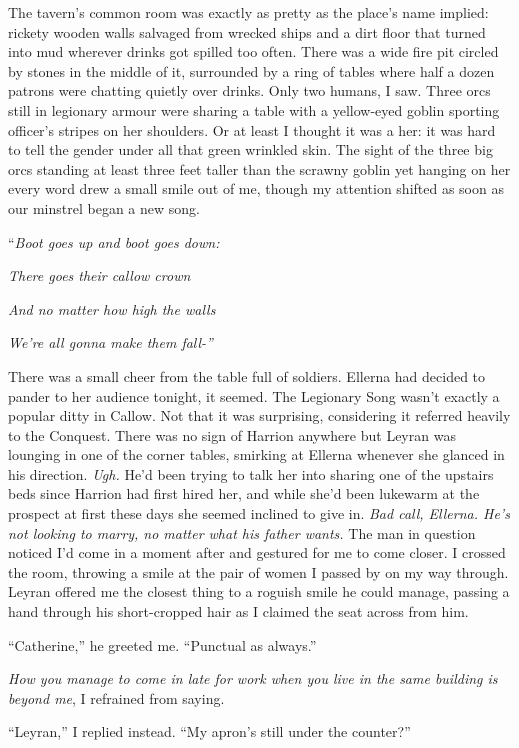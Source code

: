 \documentclass[12pt, openany]{book}
\begin{document}
The tavern’s common room was exactly as pretty as the place’s name implied: rickety wooden walls salvaged from wrecked ships and a dirt floor that turned into mud wherever drinks got spilled too often. There was a wide fire pit circled by stones in the middle of it, surrounded by a ring of tables where half a dozen patrons were chatting quietly over drinks. Only two humans, I saw. Three orcs still in legionary armour were sharing a table with a yellow-eyed goblin sporting officer’s stripes on her shoulders. Or at least I thought it was a her: it was hard to tell the gender under all that green wrinkled skin. The sight of the three big orcs standing at least three feet taller than the scrawny goblin yet hanging on her every word drew a small smile out of me, though my attention shifted as soon as our minstrel began a new song.

“\textit{Boot goes up and boot goes down:}

\textit{There goes their callow crown} 

\textit{And no matter how high the walls } 

\textit{We’re all gonna make them fall-”}

There was a small cheer from the table full of soldiers. Ellerna had decided to pander to her audience tonight, it seemed. The Legionary Song wasn’t exactly a popular ditty in Callow. Not that it was surprising, considering it referred heavily to the Conquest. There was no sign of Harrion anywhere but Leyran was lounging in one of the corner tables, smirking at Ellerna whenever she glanced in his direction. \textit{Ugh. }He’d been trying to talk her into sharing one of the upstairs beds since Harrion had first hired her, and while she’d been lukewarm at the prospect at first these days she seemed inclined to give in. \textit{Bad call, Ellerna. He’s not looking to marry, no matter what his father wants. }The man in question noticed I’d come in a moment after and gestured for me to come closer. I crossed the room, throwing a smile at the pair of women I passed by on my way through. Leyran offered me the closest thing to a roguish smile he could manage, passing a hand through his short-cropped hair as I claimed the seat across from him.

“Catherine,” he greeted me. “Punctual as always.”

\textit{How you manage to come in late for work when you live in the same building is beyond me}, I refrained from saying.

“Leyran,” I replied instead. “My apron’s still under the counter?”
\end{document}
